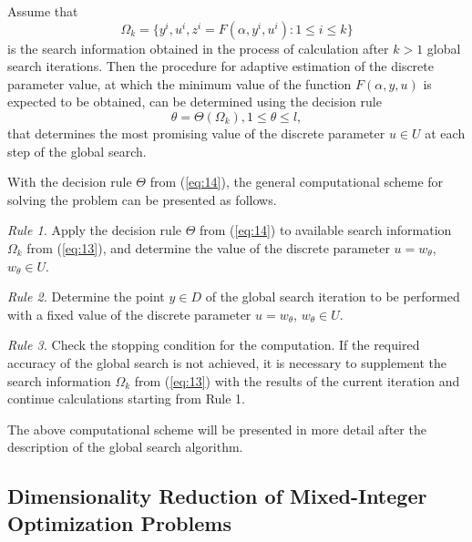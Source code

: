 \documentclass{svproc}
\begin{document}
Assume that 
\begin{equation}\label{eq:13}
 \Omega_k=\{ y^i,u^i,z^i=F(\alpha,y^i,u^i ): 1\leq i\leq k \}
\end{equation}
is the search information obtained in the process of calculation after $k>1$ global search iterations. Then the procedure for adaptive estimation of the discrete parameter value, at which the minimum value  of the function $F(\alpha,y,u)$ is expected to be obtained, can be determined using the decision rule
\begin{equation}\label{eq:14}
	\theta =\Theta(\Omega_k ),1 \leq \theta \leq l, 
\end{equation}
 that determines the most promising value of the discrete parameter $u \in U$ at each step of the global search.

With the decision rule $\Theta$ from (\ref{eq:14}), the general computational scheme for solving the problem can be presented as follows.

\textit{Rule 1.} Apply the decision rule $\Theta$ from (\ref{eq:14}) to available search information $\Omega_k$ from (\ref{eq:13}),  and determine the value of the discrete parameter $u=w_\theta$, $w_\theta \in U$.

\textit{Rule 2.} Determine the point $y \in D$ of the global search iteration to be performed with a fixed value of the discrete parameter $u=w_\theta$, $w_\theta \in U$.
			
\textit{Rule 3.} Check the stopping condition for the computation. If the required accuracy of the global search is not achieved, it is necessary to supplement the search information $\Omega_k$ from (\ref{eq:13}) with the results of the current iteration and continue calculations starting from Rule 1.

   The above computational scheme will be presented in more detail after the description of the global search algorithm. 



\subsection{Dimensionality Reduction of Mixed-Integer Optimization Problems} \label{subsec:32}
\end{document}
